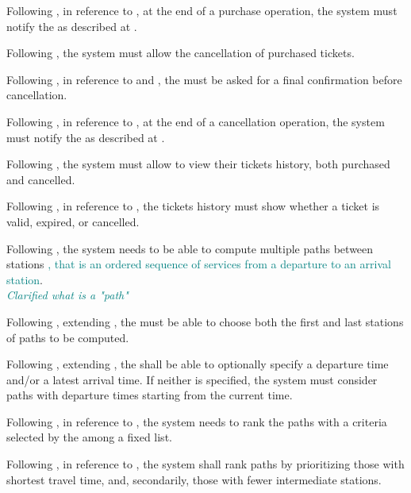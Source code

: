 Following , in reference to , at the end of a purchase operation, the system must notify the  as 
described at .

Following , the system must allow the cancellation of purchased tickets. 

Following , in reference to  and , the  must be asked for a final confirmation before 
cancellation.

Following , in reference to , at the end of a cancellation operation, the system must notify the  as 
described at .

Following , the system must allow  to view their tickets history, both purchased and cancelled.

Following , in reference to , the tickets history must show whether a ticket is valid, expired, or 
cancelled.

Following , the system needs to be able to compute multiple paths between stations \textcolor{teal}{, that is an ordered sequence of services from a departure to an arrival station}.\\
\textit{\textcolor{teal}{Clarified what is a "path"}}

Following , extending , the  must be able to choose both the first and last stations of paths to be computed.

Following , extending , the  shall be able to optionally specify a departure time and/or a latest 
arrival time. If neither is specified, the system must consider paths with departure times starting from the current time.

Following , in reference to , the system needs to rank the paths with a criteria selected by the  among a fixed list.

Following , in reference to , the system shall rank paths by prioritizing those with shortest travel time, and, secondarily, those with fewer intermediate stations.

